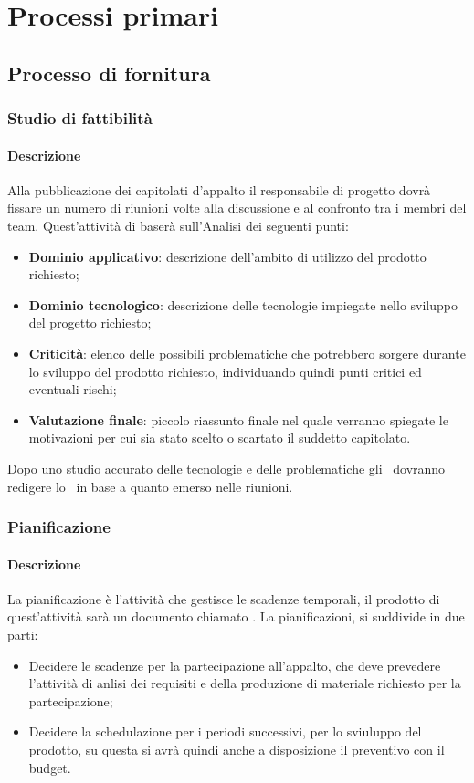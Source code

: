\documentclass[../NormeDiProgetto_v3.0.0.tex]{subfiles}
\begin{document}
\section{Processi primari}
	\subsection{Processo di fornitura}
		\subsubsection{Studio di fattibilità}
			\paragraph{Descrizione}
				Alla pubblicazione dei capitolati d'appalto il responsabile di progetto dovrà fissare un numero di riunioni volte alla discussione e al confronto tra i membri del team.
				Quest'attività di baserà sull'Analisi dei seguenti punti:
				\begin{itemize}
					\item \textbf{Dominio applicativo}: descrizione dell'ambito di utilizzo del prodotto richiesto;
					\item \textbf{Dominio tecnologico}: descrizione delle tecnologie impiegate nello sviluppo del progetto richiesto;
					\item \textbf{Criticità}: elenco delle possibili problematiche che potrebbero sorgere durante lo sviluppo del prodotto richiesto, individuando quindi punti critici ed eventuali rischi;
					\item \textbf{Valutazione finale}: piccolo riassunto finale nel quale verranno spiegate le motivazioni per cui sia stato scelto o scartato il suddetto capitolato.
				\end{itemize}
				Dopo uno studio accurato delle tecnologie e delle problematiche gli \analisti\ dovranno redigere lo \studiodifattibilitav\ in base a quanto emerso nelle riunioni. 

		\subsubsection{Pianificazione}
			\paragraph{Descrizione}
				La pianificazione è l'attività che gestisce le scadenze temporali, il prodotto di quest'attività sarà un documento chiamato \pianodiprogettov.
				La pianificazioni, si suddivide in due parti:
				\begin{itemize}
					\item Decidere le scadenze per la partecipazione all'appalto, che deve prevedere l'attività di anlisi dei requisiti e della produzione di materiale richiesto per la partecipazione;
					\item Decidere la schedulazione per i periodi successivi, per lo sviuluppo del prodotto, su questa si avrà quindi anche a disposizione il preventivo con il budget.
				\end{itemize}
\end{document}
